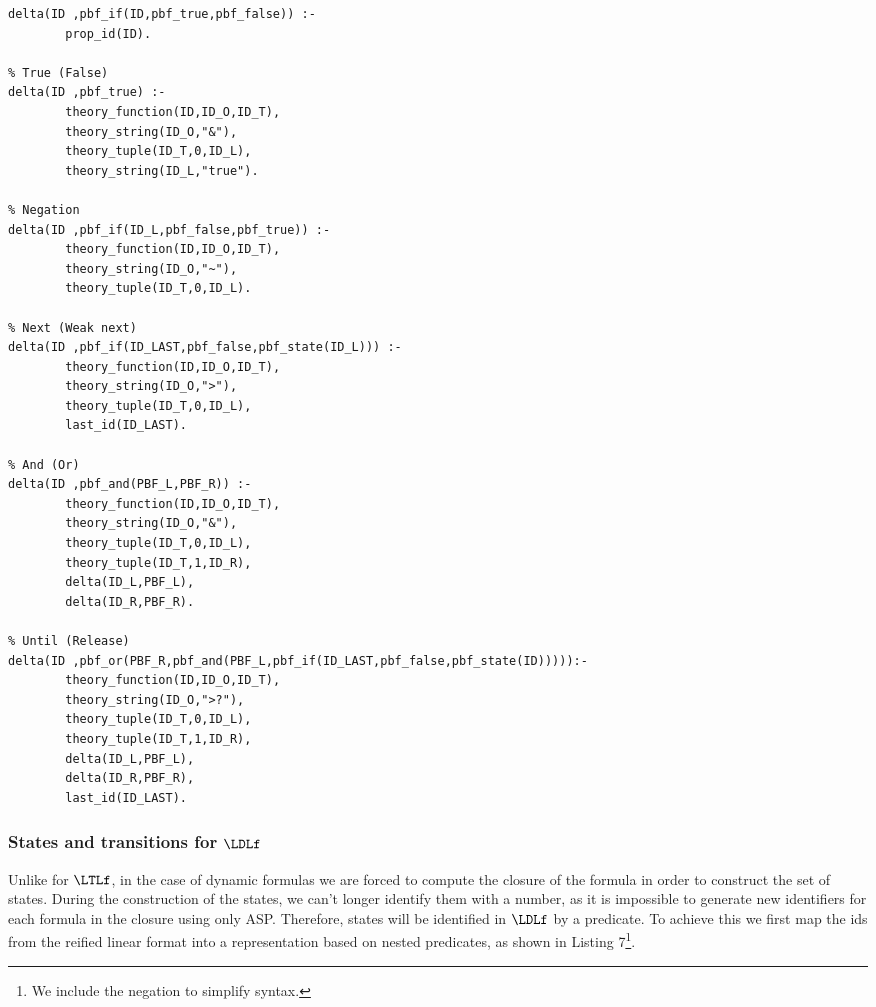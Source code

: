 \begin{center}
    \begin{lstlisting}[] 
% Proposition
delta(ID ,pbf_if(ID,pbf_true,pbf_false)) :- 
        prop_id(ID).

% True (False)
delta(ID ,pbf_true) :-
        theory_function(ID,ID_O,ID_T),
        theory_string(ID_O,"&"),
        theory_tuple(ID_T,0,ID_L),
        theory_string(ID_L,"true").

% Negation
delta(ID ,pbf_if(ID_L,pbf_false,pbf_true)) :- 
        theory_function(ID,ID_O,ID_T),
        theory_string(ID_O,"~"),
        theory_tuple(ID_T,0,ID_L).
        
% Next (Weak next)
delta(ID ,pbf_if(ID_LAST,pbf_false,pbf_state(ID_L))) :-
        theory_function(ID,ID_O,ID_T),
        theory_string(ID_O,">"),
        theory_tuple(ID_T,0,ID_L),
        last_id(ID_LAST).

% And (Or)
delta(ID ,pbf_and(PBF_L,PBF_R)) :-
        theory_function(ID,ID_O,ID_T),
        theory_string(ID_O,"&"),
        theory_tuple(ID_T,0,ID_L),
        theory_tuple(ID_T,1,ID_R),
        delta(ID_L,PBF_L),
        delta(ID_R,PBF_R).

% Until (Release)
delta(ID ,pbf_or(PBF_R,pbf_and(PBF_L,pbf_if(ID_LAST,pbf_false,pbf_state(ID))))):-
        theory_function(ID,ID_O,ID_T),
        theory_string(ID_O,">?"),
        theory_tuple(ID_T,0,ID_L),
        theory_tuple(ID_T,1,ID_R),
        delta(ID_L,PBF_L),
        delta(ID_R,PBF_R),
        last_id(ID_LAST).
\end{lstlisting}
\end{center}

\subsubsection{States and transitions for $\LDLf$}


Unlike for $\LTLf$, in the case of dynamic formulas we are forced to compute the closure of the formula in order to construct the set of states. During the construction of the states, we can't longer identify them with a number, as it is impossible to generate new identifiers for each formula in the closure using only ASP. Therefore, states will be identified in $\LDLf$ by a predicate. To achieve this we first map the ids from the reified linear format into a representation based on nested predicates, as shown in Listing 7\footnote{We include the negation to simplify syntax.}. 

